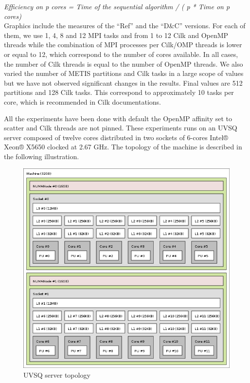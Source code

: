 \documentclass{IOS-Book-Article}
\begin{document}
\emph{Efficiency on p cores = Time of the sequential algorithm / ( p * Time on p cores)}\\

Graphics include the measures of the “Ref” and the “D\&C” versions.
For each of them, we use 1, 4, 8 and 12 MPI tasks and from 1 to 12 Cilk and OpenMP threads while the combination of MPI processes per Cilk/OMP threads is lower or equal to 12,
which correspond to the number of cores available. In all cases, the number of Cilk threads is equal to the number of OpenMP threads.
We also varied the number of METIS partitions and Cilk tasks in a large scope of values but we have not observed significant changes in the results.
Final values are 512 partitions and 128 Cilk tasks. This correspond to approximately 10 tasks per core, which is recommended in Cilk documentations.

All the experiments have been done with default the OpenMP affinity set to scatter and Cilk threads are not pinned. These experiments runs on an UVSQ server
composed of twelve cores distributed in two sockets of 6-cores Intel® Xeon® X5650 clocked at 2.67 GHz. The topology of the machine is described in the following illustration.
\begin{figure}[htp]
 \centering
 \label{fig5}
 \includegraphics[scale=0.33]{topo_mauduit.png}
 \caption{UVSQ server topology}
\end{figure}
\end{document}
